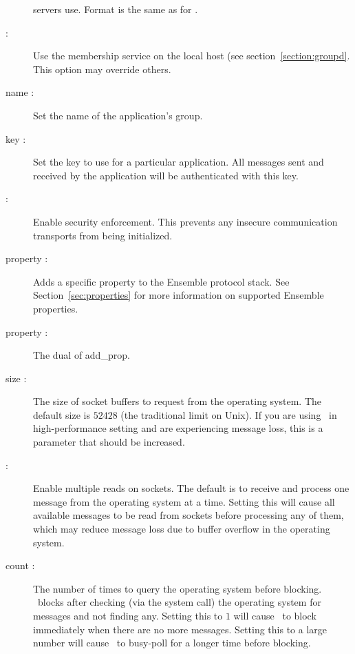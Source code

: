 \begin{description}
 servers use.  Format is the same as for .
\item
[\mlval{-groupd} :] Use the membership service on the local host (see
section~\ref{section:groupd}.  This option may override others.
\item
[\mlval{-group\_name} name :] Set the name of the application's group.
\item
[\mlval{-key} key :] Set the key to use for a particular application.  All
messages sent and received by the application will be authenticated with this
key.
\item
[\mlval{-secure} :] Enable security enforcement.  This prevents any insecure
communication transports from being initialized.
\item
[\mlval{-add\_prop} property :] Adds a specific property to the
Ensemble protocol stack. See Section~\ref{sec:properties} for more
information on supported Ensemble properties. 
\item 
[\mlval{-remove\_prop} property :] The dual of add\_prop.
\item 
[\mlval{-sock\_buf} size :] The size of socket buffers to request
from the operating system.  The default size is $52428$ (the
traditional limit on Unix).  If you are using \ensemble\ in
high-performance setting and are experiencing message loss, this is a
parameter that should be increased.
\item
[\mlval{-multiread} :] Enable multiple reads on sockets.  The default
is to receive and process one message from the operating system
at a time.  Setting this will cause all available messages to be read
from sockets before processing any of them, which may reduce message
loss due to buffer overflow in the operating system.
\item
[\mlval{-pollcount} count :] The number of times to query the
operating system before blocking.  \ensemble\ blocks after checking
(via the  system call) the operating system for
messages and not finding any.  Setting this to $1$ will cause
\ensemble\ to block immediately when there are no more messages.
Setting this to a large number will cause \ensemble\ to busy-poll for
a longer time before blocking.
\end{description}

